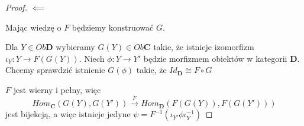 \begin{proof}
  $\impliedby$

  Mając wiedzę o $F$ będziemy konstruować $G$.

  Dla $Y\in Ob\mathbf{D}$ wybieramy $G(Y)\in Ob\mathbf{C}$ takie, że istnieje izomorfizm $\iota_Y:Y\to F(G(Y))$. Niech $\phi:Y\to Y'$ będzie morfizmem obiektów w kategorii $\mathbf{D}$. Chcemy sprawdzić istnienie $G(\phi)$ takie, że $Id_{\mathbf{D}}\cong F\circ G$

  \begin{center}
  \end{center}

  $F$ jest wierny i pełny, więc
  $$Hom_{\mathbf{C}}(G(Y),G(Y'))\overset{F}{\rightarrow}Hom_{\mathbf{D}}(F(G(Y)),F(G(Y')))$$
  jest bijekcją, a więc istnieje jedyne $\psi=F^{-1}(\iota_{Y'}\phi\iota_Y^{-1})$
\end{proof}
